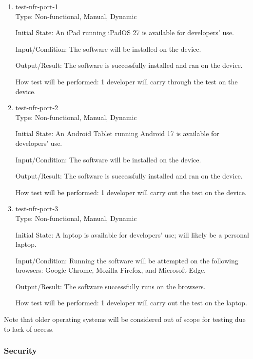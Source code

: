 \documentclass[12pt, titlepage]{article}
\begin{document}
\begin{enumerate}

\item\label{test-nfr-port-1} test-nfr-port-1\\

Type: Non-functional, Manual, Dynamic

Initial State: An iPad running iPadOS 27 is available for developers' use.
					
Input/Condition: The software will be installed on the device.

Output/Result: The software is successfully installed and ran on the device.
					
How test will be performed: 1 developer will carry through the test on the device.

\item\label{test-nfr-port-2} test-nfr-port-2\\

Type: Non-functional, Manual, Dynamic

Initial State: An Android Tablet running Android 17 is available for developers' use.
					
Input/Condition: The software will be installed on the device.

Output/Result: The software is successfully installed and ran on the device.
					
How test will be performed: 1 developer will carry out the test on the device.

\item\label{test-nfr-port-3} test-nfr-port-3\\

Type: Non-functional, Manual, Dynamic

Initial State: A laptop is available for developers' use; will likely be a personal laptop.
					
Input/Condition: Running the software will be attempted on the following browsers: Google Chrome, Mozilla Firefox, and Microsoft Edge.

Output/Result: The software successfully runs on the browsers.
					
How test will be performed: 1 developer will carry out the test on the laptop.

\end{enumerate}

Note that older operating systems will be considered out of scope for testing due to lack of access.
\subsubsection{Security}
\end{document}

